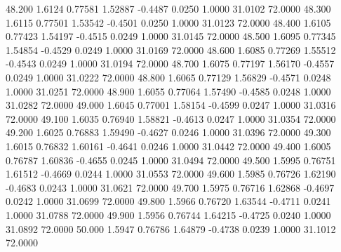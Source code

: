   48.200   1.6124   0.77581   1.52887  -0.4487   0.0250   1.0000  31.0102  72.0000
  48.300   1.6115   0.77501   1.53542  -0.4501   0.0250   1.0000  31.0123  72.0000
  48.400   1.6105   0.77423   1.54197  -0.4515   0.0249   1.0000  31.0145  72.0000
  48.500   1.6095   0.77345   1.54854  -0.4529   0.0249   1.0000  31.0169  72.0000
  48.600   1.6085   0.77269   1.55512  -0.4543   0.0249   1.0000  31.0194  72.0000
  48.700   1.6075   0.77197   1.56170  -0.4557   0.0249   1.0000  31.0222  72.0000
  48.800   1.6065   0.77129   1.56829  -0.4571   0.0248   1.0000  31.0251  72.0000
  48.900   1.6055   0.77064   1.57490  -0.4585   0.0248   1.0000  31.0282  72.0000
  49.000   1.6045   0.77001   1.58154  -0.4599   0.0247   1.0000  31.0316  72.0000
  49.100   1.6035   0.76940   1.58821  -0.4613   0.0247   1.0000  31.0354  72.0000
  49.200   1.6025   0.76883   1.59490  -0.4627   0.0246   1.0000  31.0396  72.0000
  49.300   1.6015   0.76832   1.60161  -0.4641   0.0246   1.0000  31.0442  72.0000
  49.400   1.6005   0.76787   1.60836  -0.4655   0.0245   1.0000  31.0494  72.0000
  49.500   1.5995   0.76751   1.61512  -0.4669   0.0244   1.0000  31.0553  72.0000
  49.600   1.5985   0.76726   1.62190  -0.4683   0.0243   1.0000  31.0621  72.0000
  49.700   1.5975   0.76716   1.62868  -0.4697   0.0242   1.0000  31.0699  72.0000
  49.800   1.5966   0.76720   1.63544  -0.4711   0.0241   1.0000  31.0788  72.0000
  49.900   1.5956   0.76744   1.64215  -0.4725   0.0240   1.0000  31.0892  72.0000
  50.000   1.5947   0.76786   1.64879  -0.4738   0.0239   1.0000  31.1012  72.0000
